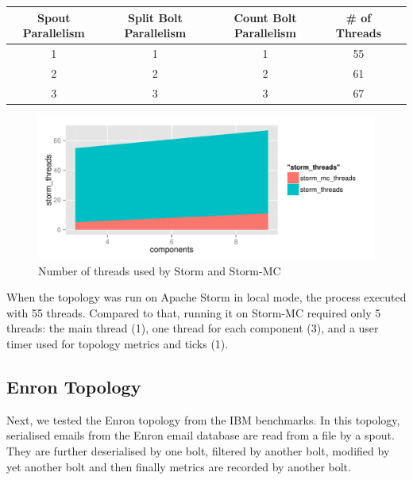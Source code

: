 \documentclass[bsc,logo,frontabs,twoside,singlespacing,normalheadings,parskip]{infthesis}\usepackage[]{graphicx}\usepackage[]{color}
\makeatletter
\def\maxwidth{ %
  \ifdim\Gin@nat@width>\linewidth
    \linewidth
  \else
    \Gin@nat@width
  \fi
}
\newenvironment{knitrout}{}{} %
\makeatother
\begin{document}
\begin{tabular}{c c c c c} \toprule
    {Spout Parallelism} & {Split Bolt Parallelism} & {Count Bolt Parallelism} & {\# of Threads} \\ \midrule
    1 & 1 & 1 & 55  \\ \midrule
    2 & 2 & 2 & 61  \\ \midrule
    3 & 3 & 3 & 67  \\ \bottomrule
\end{tabular}

\begin{knitrout}
\color{fgcolor}\begin{figure}

{\centering \includegraphics[width=\maxwidth]{figure/threads-plot-1} 

}

\caption[Number of threads used by Storm and Storm-MC]{Number of threads used by Storm and Storm-MC}\label{fig:threads-plot}
\end{figure}


\end{knitrout}


When the topology was run on Apache Storm in local mode, the process executed with 55 threads. Compared to that, running it on Storm-MC required only 5 threads: the main thread (1), one thread for each component (3), and a user timer used for topology metrics and ticks (1).

\subsection{Enron Topology}

Next, we tested the Enron topology from the IBM benchmarks. In this topology, serialised emails from the Enron email database are read from a file by a spout. They are further deserialised by one bolt, filtered by another bolt, modified by yet another bolt and then finally metrics are recorded by another bolt.
\end{document}
